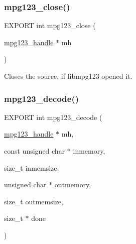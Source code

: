 \subsubsection{\texorpdfstring{mpg123\+\_\+close()}{mpg123\_close()}}
{\footnotesize\ttfamily E\+X\+P\+O\+RT int mpg123\+\_\+close (\begin{DoxyParamCaption}\item[{\hyperlink{group__mpg123__init_ga6728e2839a395f3a07d4514da659faca}{mpg123\+\_\+handle} $\ast$}]{mh }\end{DoxyParamCaption})}

Closes the source, if libmpg123 opened it. \mbox{\label{group__mpg123__input_gad35309fe0892d534b6430e3bfde68358}} 
\subsubsection{\texorpdfstring{mpg123\+\_\+decode()}{mpg123\_decode()}}
{\footnotesize\ttfamily E\+X\+P\+O\+RT int mpg123\+\_\+decode (\begin{DoxyParamCaption}\item[{\hyperlink{group__mpg123__init_ga6728e2839a395f3a07d4514da659faca}{mpg123\+\_\+handle} $\ast$}]{mh,  }\item[{const unsigned char $\ast$}]{inmemory,  }\item[{size\+\_\+t}]{inmemsize,  }\item[{unsigned char $\ast$}]{outmemory,  }\item[{size\+\_\+t}]{outmemsize,  }\item[{size\+\_\+t $\ast$}]{done }\end{DoxyParamCaption})}

